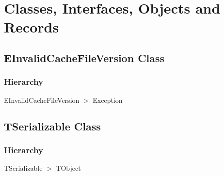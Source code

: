\documentclass{report}
\newif\ifpdf
\begin{document}
\section{Classes, Interfaces, Objects and Records}
\ifpdf
\subsection*{\large{\textbf{EInvalidCacheFileVersion Class}}\normalsize\hspace{1ex}\hrulefill}
\else
\subsection*{EInvalidCacheFileVersion Class}
\fi
\label{PasDoc_Serialize.EInvalidCacheFileVersion}
\subsubsection*{\large{\textbf{Hierarchy}}\normalsize\hspace{1ex}\hfill}
EInvalidCacheFileVersion {$>$} Exception
\ifpdf
\subsection*{\large{\textbf{TSerializable Class}}\normalsize\hspace{1ex}\hrulefill}
\else
\subsection*{TSerializable Class}
\fi
\label{PasDoc_Serialize.TSerializable}
\subsubsection*{\large{\textbf{Hierarchy}}\normalsize\hspace{1ex}\hfill}
TSerializable {$>$} TObject
\end{document}
